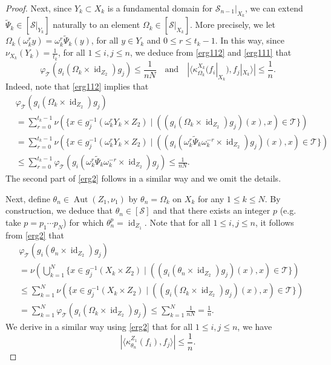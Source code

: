 \documentclass[11pt]{amsart}
\numberwithin{equation}{section}
\theoremstyle{plain}
\theoremstyle{definition}
\newcommand{\Aut}{\operatorname{Aut}}
\newcommand{\id}{\operatorname{id}}
\begin{document}
\begin{proof}
Next, since $Y_k\subset X_k$ is a fundamental domain for $\mathscr S_{n-1}|_{X_k}$, we can extend $\tilde\Psi_k\in [\mathscr S|_{Y_k}]$ naturally to an element $\Omega_k\in [\mathscr S|_{X_k}]$. More precisely, we let $\Omega_k(\omega_k^r y)= \omega_k^r \tilde\Psi_k(y)$, for all $y\in Y_k$ and $0\leq r\leq t_k-1$.
In this way, since $\nu_{X_k}(Y_k)=\frac{1}{t_k}$, for all $1\leq i,j\leq n$, we deduce from \eqref{erg112} and \eqref{erg111} that
\begin{equation}\label{erg2}
\varphi_{\mathscr T}(g_i (\Omega_k\times \id_{Z_2}) g_j)\leq \frac{1}{n N} \quad \text{and} \quad |\langle \kappa^{X_k}_{\Omega_k}(f_i|_{X_k}),f_j|_{X_k}  \rangle|\leq \frac{1}{n}.    
\end{equation}
Indeed, note that \eqref{erg112} implies that
\begin{align*}
& \varphi_{\mathscr T}(g_i (\Omega_k\times \id_{Z_2}) g_j) \\
&=\sum_{r=0}^{t_k-1} \nu(\{ x \in g_j^{-1} (\omega_k^r Y_k \times Z_2)\mid ((g_i (\Omega_k\times \id_{Z_2}) g_j)(x),x) \in \mathscr T \}) \\
&=\sum_{r=0}^{t_k-1} \nu(\{ x \in g_j^{-1} (\omega_k^r Y_k \times Z_2)\mid ((g_i (\omega_k^r\tilde\Psi_k \omega_k^{-r}\times \id_{Z_2}) g_j)(x),x) \in \mathscr T \}) \\
&\leq \sum_{r=0}^{t_k-1}\varphi_{\mathscr T}(g_i (\omega_k^r\tilde\Psi_k \omega_k^{-r} \times \id_{Z_2}) g_j)\leq\frac{1}{nN}.
\end{align*}
The second part of \eqref{erg2} follows in a similar way and we omit the details.

Next, define $\theta_n\in \Aut(Z_1, \nu_1)$ by $\theta_n= \Omega_k$ on $X_k$ for any $1\leq k\leq N$. By construction, we deduce that $\theta_n\in [\mathscr S]$ and that there exists an integer $p$ (e.g.\! take $p=p_1 \cdots p_N$) for which $\theta_n^p= \id_{Z_1}$. Note that for all $1\leq i,j\leq n$, it follows from \eqref{erg2} that 
\begin{align*}
& \varphi_{\mathscr T}(g_i (\theta_n\times \id_{Z_2}) g_j) \\
&=\nu(\bigcup_{k=1}^{N} \{ x \in g_j^{-1} (X_k\times Z_2) \mid ((g_i (\theta_n\times \id_{Z_2}) g_j)(x),x) \in \mathscr T \} )\\
&\leq \sum_{k=1}^N \nu(\{ x \in g_j^{-1} (X_k \times Z_2)\mid ((g_i (\Omega_k \times \id_{Z_2})g_j)(x),x) \in \mathscr T \})\\
&=\sum_{k=1}^N  \varphi_{\mathscr T}(g_i (\Omega_k\times \id_{Z_2}) g_j)\leq \sum_{k=1}^N \frac{1}{n N} = \frac{1}{n}.
\end{align*}
We derive in a similar way using \eqref{erg2} that
for all $1\leq i,j\leq n$, we have
\begin{equation}\label{erg3}
|\langle \kappa^{Z_1}_{\theta_n}(f_i),f_j \rangle|\leq \frac{1}{n}.  
\end{equation}


\end{proof}
\end{document}
